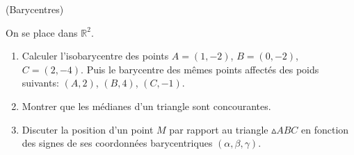 \documentclass[a4paper,12pt,reqno]{amsart}
\begin{document}
\begin{exo} (Barycentres)

On se place dans $\mathbb{R}^{2}$.

\begin{enumerate}
  \item Calculer l'isobarycentre des points $A=(1,-2)$, $B=(0,-2)$, $C=(2,-4)$. Puis le barycentre des mêmes points affectés des poids suivants: $(A,2)$, $(B,4)$, $(C,-1)$.

  \item Montrer que les médianes d'un triangle sont concourantes.

  \item Discuter la position d'un point $M$ par rapport au triangle $\vartriangle\! ABC$ en fonction des signes de ses coordonnées barycentriques $(\alpha, \beta, \gamma)$.

\end{enumerate}

\end{exo}
\end{document}
